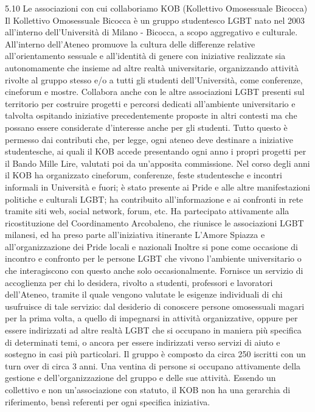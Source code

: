5.10 Le associazioni con cui collaboriamo
KOB (Kollettivo Omosessuale Bicocca)
Il Kollettivo Omosessuale Bicocca è un gruppo studentesco LGBT nato nel 2003 all'interno dell'Università di Milano - Bicocca, a scopo aggregativo e culturale. 
All'interno dell'Ateneo promuove la cultura delle differenze relative all'orientamento sessuale e all'identità di genere con iniziative realizzate sia autonomamente che insieme ad altre realtà universitarie, organizzando attività rivolte al gruppo stesso e/o a tutti gli studenti dell'Università, come conferenze, cineforum e mostre. Collabora anche con le altre associazioni LGBT presenti sul territorio per costruire progetti e percorsi dedicati all'ambiente universitario e talvolta ospitando iniziative precedentemente proposte in altri contesti ma che possano essere considerate d'interesse anche per gli studenti. 
Tutto questo è permesso dai contributi che, per legge, ogni ateneo deve destinare a iniziative studentesche, ai quali il KOB accede presentando ogni anno i propri progetti per il Bando Mille Lire, valutati poi da un'apposita commissione. Nel corso degli anni il KOB ha organizzato cineforum, conferenze, feste studentesche e incontri informali in Università e fuori; è stato presente ai Pride e alle altre manifestazioni politiche e culturali LGBT; ha contribuito all'informazione e ai confronti in rete tramite siti web, social network, forum, etc. Ha partecipato attivamente alla ricostituzione del Coordinamento Arcobaleno, che riunisce le associazioni LGBT milanesi, ed ha preso parte all'iniziativa itinerante L'Amore Spiazza e all'organizzazione dei Pride locali e nazionali Inoltre si pone come occasione di incontro e confronto per le persone LGBT che vivono l'ambiente universitario o che interagiscono con questo anche solo occasionalmente. Fornisce un servizio di accoglienza per chi lo desidera, rivolto a studenti, professori e lavoratori dell'Ateneo, tramite il quale vengono valutate le esigenze individuali di chi usufruisce di tale servizio: dal desiderio di conoscere persone omosessuali magari per la prima volta, a quello di impegnarsi in attività organizzative, oppure per essere indirizzati ad altre realtà LGBT che si occupano in maniera più specifica di determinati temi, o ancora per essere indirizzati verso servizi di aiuto e sostegno in casi più particolari. 
Il gruppo è composto da circa 250 iscritti con un turn over di circa 3 anni. Una ventina di persone si occupano attivamente della gestione e dell'organizzazione del gruppo e delle sue attività. Essendo un collettivo e non un'associazione con statuto, il KOB non ha una gerarchia di riferimento, bensì referenti per ogni specifica iniziativa. 

